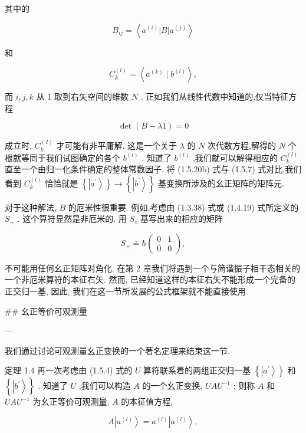 \documentclass[lang=cn,newtx,10pt,scheme=chinese,thmcnt=section]{elegantbook}
\begin{document}
其中的

$$
{B}_{ij} = \left\langle {{a}^{\left( i\right) }\left| B\right| {a}^{\left( j\right) }}\right\rangle \tag{1.5.20a}
$$

和

$$
{C}_{k}^{\left( l\right) } = \left\langle {{a}^{\left( k\right) } \mid {b}^{\left( l\right) }}\right\rangle , \tag{1.5.20b}
$$

而 $i, j, k$ 从 1 取到右矢空间的维数 $N$ . 正如我们从线性代数中知道的,仅当特征方程

$$
\det \left( {B - {\lambda 1}}\right) = 0 \tag{1.5.21}
$$

成立时, ${C}_{k}^{\left( I\right) }$ 才可能有非平庸解. 这是一个关于 $\lambda$ 的 $N$ 次代数方程,解得的 $N$ 个根就等同于我们试图确定的各个 ${b}^{\left( l\right) }$ . 知道了 ${b}^{\left( l\right) }$ ,我们就可以解得相应的 ${C}_{k}^{\left( l\right) }$ 直至一个由归一化条件确定的整体常数因子. 将 (1.5.20b) 式与 (1.5.7) 式对比,我们看到 ${C}_{k}^{\left( l\right) }$ 恰恰就是 $\left\{ \left| {a}^{\prime }\right\rangle \right\} \rightarrow \left\{ \left| {b}^{\prime }\right\rangle \right\}$ 基变换所涉及的幺正矩阵的矩阵元.

对于这种解法, $B$ 的厄米性很重要. 例如,考虑由 (1.3.38) 式或 (1.4.19) 式所定义的 ${S}_{ + }$ . 这个算符显然是非厄米的. 用 ${S}_{z}$ 基写出来的相应的矩阵

$$
{S}_{ + } \doteq \hbar \left( \begin{array}{ll} 0 & 1 \\ 0 & 0 \end{array}\right) , \tag{1.5.22}
$$

不可能用任何幺正矩阵对角化. 在第 2 章我们将遇到一个与简谐振子相干态相关的一个非厄米算符的本征右矢. 然而, 已经知道这样的本征右矢不能形成一个完备的正交归一基, 因此, 我们在这一节所发展的公式框架就不能直接使用.

## 幺正等价可观测量

---

我们通过讨论可观测量幺正变换的一个著名定理来结束这一节.

定理 1.4 再一次考虑由 (1.5.4) 式的 $U$ 算符联系着的两组正交归一基 $\left\{ \left| {a}^{\prime }\right\rangle \right\}$ 和 $\left\{ \left| {b}^{\prime }\right\rangle \right\}$ . 知道了 $U$ ,我们可以构造 $A$ 的一个幺正变换, ${UA}{U}^{-1}$ ; 则称 $A$ 和 ${UA}{U}^{-1}$ 为幺正等价可观测量. $A$ 的本征值方程,

$$
A\left| {a}^{\left( l\right) }\right\rangle = {a}^{\left( l\right) }\left| {a}^{\left( l\right) }\right\rangle , \tag{1.5.23}
$$
\end{document}
